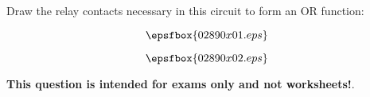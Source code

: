 

Draw the relay contacts necessary in this circuit to form an OR function:

$$\epsfbox{02890x01.eps}$$







$$\epsfbox{02890x02.eps}$$







{\bf This question is intended for exams only and not worksheets!}.




